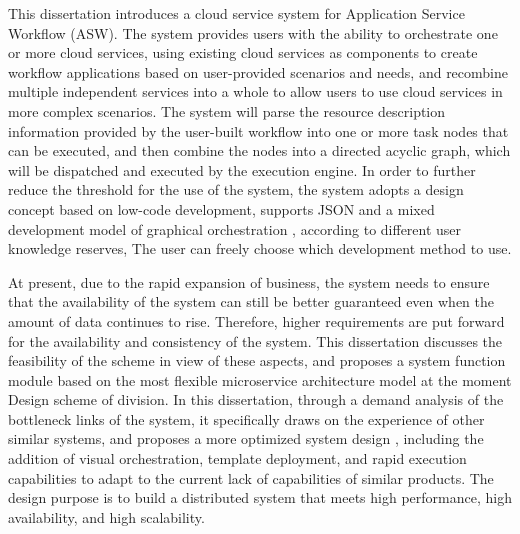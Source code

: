 \begin{abstract*}
  This dissertation introduces a cloud service system for Application Service Workflow (ASW).
  The system provides users with the ability to orchestrate one or more cloud services,
  using existing cloud services as components to create workflow applications based on user-provided scenarios and needs,
  and recombine multiple independent services into a whole to allow users to use cloud services in more complex scenarios.
  The system will parse the resource description information provided by the user-built workflow into one or more task
  nodes that can be executed, and then combine the nodes into a directed acyclic graph,
  which will be dispatched and executed by the execution engine.
  In order to further reduce the threshold for the use of the system, the system adopts a design concept based on
  low-code development, supports JSON and a mixed development model of graphical orchestration \cite{othe4},
  according to different user knowledge reserves, The user can freely choose which development method to use.

  At present, due to the rapid expansion of business, the system needs to ensure that the availability of the system can
  still be better guaranteed even when the amount of data continues to rise.
  Therefore, higher requirements are put forward for the availability and consistency of the system.
  This dissertation discusses the feasibility of the scheme in view of these aspects,
  and proposes a system function module based on the most flexible microservice architecture model at the moment
  Design scheme of division.
  In this dissertation, through a demand analysis of the bottleneck links of the system, it specifically draws on the experience
  of other similar systems, and proposes a more optimized system design \cite{othe3},
  including the addition of visual orchestration, template deployment, and rapid execution capabilities to adapt to the
  current lack of capabilities of similar products.
  The design purpose is to build a distributed system that meets high performance, high availability, and high scalability.

\end{abstract*}

